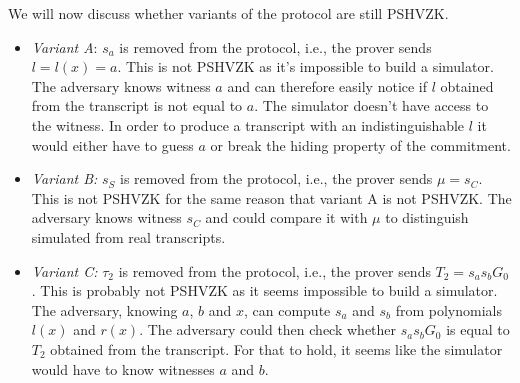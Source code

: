We will now discuss whether variants of the protocol are still PSHVZK.
\begin{itemize}
  \item \emph{Variant A}: $s_a$ is removed from the protocol, i.e., the prover sends $l = l(x) = a$. This is not PSHVZK as it's impossible to build a simulator. The adversary knows witness $a$ and can therefore easily notice if $l$ obtained from the transcript is not equal to $a$. The simulator doesn't have access to the witness. In order to produce a transcript with an indistinguishable $l$ it would either have to guess $a$ or break the hiding property of the commitment.
  \item \emph{Variant B:} $s_S$ is removed from the protocol, i.e., the prover sends $\mu = s_C$. This is not PSHVZK for the same reason that variant A is not PSHVZK. The adversary knows witness $s_C$ and could compare it with $\mu$ to distinguish simulated from real transcripts.
  \item \emph{Variant C:} $\tau_2$ is removed from the protocol, i.e., the prover sends $T_2 = s_as_bG_0$. This is probably not PSHVZK as it seems impossible to build a simulator. The adversary, knowing $a$, $b$ and $x$, can compute $s_a$ and $s_b$ from polynomials $l(x)$ and $r(x)$.
    The adversary could then check whether $s_as_bG_0$ is equal to $T_2$ obtained from the transcript.
    For that to hold, it seems like the simulator would have to know witnesses $a$ and $b$.
\end{itemize}

